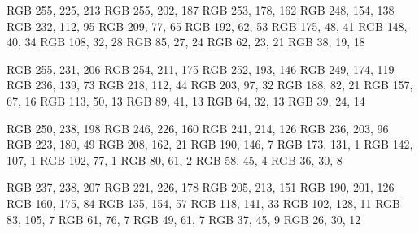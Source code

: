 
\definecolor{red-50}  {RGB} {255, 225, 213}
\definecolor{red-100} {RGB} {255, 202, 187}
\definecolor{red-150} {RGB} {253, 178, 162}
\definecolor{red-200} {RGB} {248, 154, 138}
\definecolor{red-300} {RGB} {232, 112, 95}
\definecolor{red-400} {RGB} {209, 77, 65}
\definecolor{red-500} {RGB} {192, 62, 53}
\definecolor{red-600} {RGB} {175, 48, 41}
\definecolor{red-700} {RGB} {148, 40, 34}
\definecolor{red-800} {RGB} {108, 32, 28}
\definecolor{red-850} {RGB} {85, 27, 24}
\definecolor{red-900} {RGB} {62, 23, 21}
\definecolor{red-950} {RGB} {38, 19, 18}

\definecolor{orange-50}  {RGB} {255, 231, 206}
\definecolor{orange-100} {RGB} {254, 211, 175}
\definecolor{orange-150} {RGB} {252, 193, 146}
\definecolor{orange-200} {RGB} {249, 174, 119}
\definecolor{orange-300} {RGB} {236, 139, 73}
\definecolor{orange-400} {RGB} {218, 112, 44}
\definecolor{orange-500} {RGB} {203, 97, 32}
\definecolor{orange-600} {RGB} {188, 82, 21}
\definecolor{orange-700} {RGB} {157, 67, 16}
\definecolor{orange-800} {RGB} {113, 50, 13}
\definecolor{orange-850} {RGB} {89, 41, 13}
\definecolor{orange-900} {RGB} {64, 32, 13}
\definecolor{orange-950} {RGB} {39, 24, 14}

\definecolor{yellow-50}  {RGB} {250, 238, 198}
\definecolor{yellow-100} {RGB} {246, 226, 160}
\definecolor{yellow-150} {RGB} {241, 214, 126}
\definecolor{yellow-200} {RGB} {236, 203, 96}
\definecolor{yellow-300} {RGB} {223, 180, 49}
\definecolor{yellow-400} {RGB} {208, 162, 21}
\definecolor{yellow-500} {RGB} {190, 146, 7}
\definecolor{yellow-600} {RGB} {173, 131, 1}
\definecolor{yellow-700} {RGB} {142, 107, 1}
\definecolor{yellow-800} {RGB} {102, 77, 1}
\definecolor{yellow-850} {RGB} {80, 61, 2}
\definecolor{yellow-900} {RGB} {58, 45, 4}
\definecolor{yellow-950} {RGB} {36, 30, 8}

\definecolor{green-50}  {RGB} {237, 238, 207}
\definecolor{green-100} {RGB} {221, 226, 178}
\definecolor{green-150} {RGB} {205, 213, 151}
\definecolor{green-200} {RGB} {190, 201, 126}
\definecolor{green-300} {RGB} {160, 175, 84}
\definecolor{green-400} {RGB} {135, 154, 57}
\definecolor{green-500} {RGB} {118, 141, 33}
\definecolor{green-600} {RGB} {102, 128, 11}
\definecolor{green-700} {RGB} {83, 105, 7}
\definecolor{green-800} {RGB} {61, 76, 7}
\definecolor{green-850} {RGB} {49, 61, 7}
\definecolor{green-900} {RGB} {37, 45, 9}
\definecolor{green-950} {RGB} {26, 30, 12}

